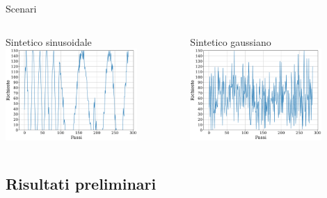 \documentclass[]{beamer}
\begin{document}
\begin{frame}{Scenari}
    \begin{columns}
        \begin{column}{.5\textwidth}
            \centering
            Sintetico sinusoidale
            \includegraphics[width=5cm]{assets/5/requests_sinusoidal_64425_single_agent.pdf}
        \end{column}
        \begin{column}{.5\textwidth}
            \centering
            Sintetico gaussiano
            \includegraphics[width=5cm]{assets/5/requests_normal_64425_single_agent.pdf}
        \end{column}
    \end{columns}
\end{frame}

\subsection{Risultati preliminari}
\end{document}
